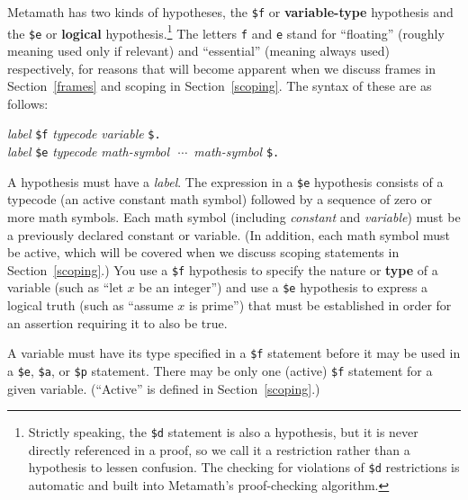 Metamath has two kinds of hypo\-theses, the \texttt{\$f} or {\bf variable-type} hypothesis and the \texttt{\$e} or {\bf logical}
hypo\-the\-sis.\footnote{Strictly speaking, the
\texttt{\$d} statement is also a hypothesis, but it is never directly referenced
in a proof, so we call it a restriction rather than a hypothesis to lessen
confusion.  The checking for violations of \texttt{\$d} restrictions is automatic
and built into Metamath's proof-checking algorithm.} The letters \texttt{f} and
\texttt{e} stand for ``floating'' (roughly meaning
used only if relevant) and ``essential'' (meaning
always used) respectively, for reasons that will become apparent
when we discuss frames in
Section~\ref{frames} and scoping in Section~\ref{scoping}. The syntax of these
are as follows:
\begin{center}
  {\em label} \texttt{\$f} {\em typecode} {\em variable} \texttt{\$.}\\
  {\em label} \texttt{\$e} {\em typecode}
      {\em math-symbol}\ \,$\cdots$\ {\em math-symbol} \texttt{\$.}\\
\end{center}
A hypothesis must have a {\em label}.  The expression in a
\texttt{\$e} hypothesis consists of a typecode (an active constant math symbol)
followed by a sequence
of zero or more math symbols. Each math symbol (including {\em constant}
and {\em variable}) must be a previously declared constant or variable.  (In
addition, each math symbol must be active, which will be covered when we
discuss scoping statements in Section~\ref{scoping}.)  You use a \texttt{\$f}
hypothesis to specify the
nature or {\bf type} of a variable (such as ``let $x$ be an
integer'') and use a \texttt{\$e} hypothesis to express a logical truth (such as
``assume $x$ is prime'') that must be established in order for an assertion
requiring it to also be true.

A variable must have its type specified in a \texttt{\$f} statement before
it may be used in a \texttt{\$e}, \texttt{\$a}, or \texttt{\$p}
statement.  There may be only one (active) \texttt{\$f} statement for a
given variable.  (``Active'' is defined in Section~\ref{scoping}.)

